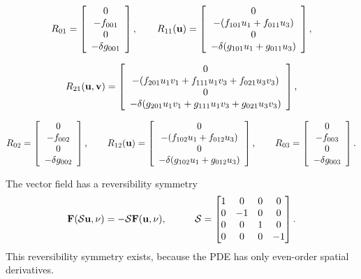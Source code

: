 \documentclass[11pt]{article}
\numberwithin{equation}{section}
\begin{document}
\begin{equation}
R_{01} = \left[
\begin{array}{c}
0 \\
-f_{001} \\
0 \\
-\delta g_{001}
\end{array}
\right],
\qquad  
R_{11} ({\bf u}) = \left[
\begin{array}{c}
0 \\
-( f_{101} u_1 + f_{011} u_3)\\
0 \\
-\delta ( g_{101} u_1 + g_{011} u_3)
\end{array}
\right],
\end{equation}

\begin{equation}
R_{21} ({\bf u}, {\bf v}) = \left[
\begin{array}{c}
0 \\
-( f_{201} u_1 v_1 + f_{111} u_1 v_3 + f_{021} u_3 v_3) \\
0 \\
-\delta ( g_{201} u_1 v_1 + g_{111} u_1 v_3 + g_{021} u_3 v_3)
\end{array}
\right],
\end{equation}

\begin{equation}
R_{02} = \left[
\begin{array}{c}
0 \\
-f_{002} \\
0 \\
-\delta g_{002}
\end{array}
\right],
\qquad 
R_{12} ({\bf u}) = \left[
\begin{array}{c}
0 \\
-( f_{102} u_1 + f_{012} u_3)\\
0 \\
-\delta ( g_{102} u_1 + g_{012} u_3)
\end{array}
\right],
\qquad 
R_{03} = \left[
\begin{array}{c}
0 \\
-f_{003} \\
0 \\
-\delta g_{003}
\end{array}
\right].
\end{equation}

The vector field has a reversibility symmetry
\begin{equation}
{\bf F} (\mathcal{S} {\bf u}, \nu) = - \mathcal{S} {\bf F}({\bf u},\nu),
\hskip0.4truein
\mathcal{S} = \begin{bmatrix} 1 & 0 & 0 & 0 \\ 0 & -1 & 0 & 0 \\ 0 & 0 & 1 & 0 \\ 0 & 0 & 0 & -1 \end{bmatrix}.
\end{equation}
%
This reversibility symmetry exists, because the PDE has only even-order spatial derivatives. 
\end{document}
